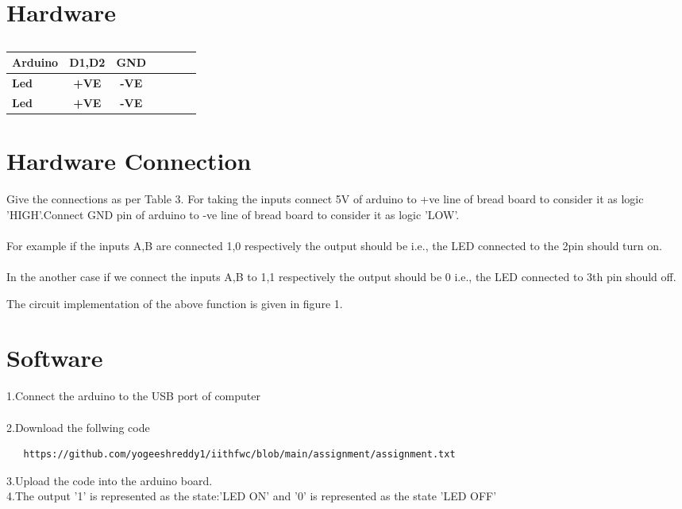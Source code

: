 \documentclass[10pt, a4paper]{article}
\begin{document}
\begin{table}[htbp]


   
    \section{Hardware}
\begin{center}
    \begin{tabular}{|l|c|c|c|c|c|c|} \hline 
 \textbf{Arduino} & \textbf{D1,D2} & \textbf{GND} \\ \hline
 \textbf{Led} & \textbf{+VE} & \textbf{-VE}\\ \hline
 \textbf{Led} & \textbf{+VE} & \textbf{-VE}\\ \hline
\end{tabular}   
\end{center}
\caption{\label{table:dummytable}}
\end{table}
   
   \section{Hardware Connection}
   Give the connections as per Table 3. For taking the inputs connect 5V of arduino to +ve line of bread board to consider it as logic 'HIGH'.Connect GND pin of arduino to -ve line of bread board to consider it as logic 'LOW'.
\\
\\
For example if the inputs A,B are connected 1,0 respectively the output should be  i.e., the LED connected to the  2pin should turn on.
\\
\\
In the another case if we connect the inputs A,B to 1,1 respectively the output should be 0 i.e., the LED connected to 3th pin should off.

The circuit implementation of the above function is given in figure 1.
\section{Software}
  1.Connect the arduino to the USB port of computer
  \\
  \\2.Download the follwing code
  \\
  \begin{lstlisting}
   https://github.com/yogeeshreddy1/iithfwc/blob/main/assignment/assignment.txt
  \end{lstlisting}
  
  3.Upload the code into the arduino board.
  \\4.The output '1' is represented as the state:'LED ON' and '0' is represented as the state 'LED OFF'



   
   
 
\end{document}
